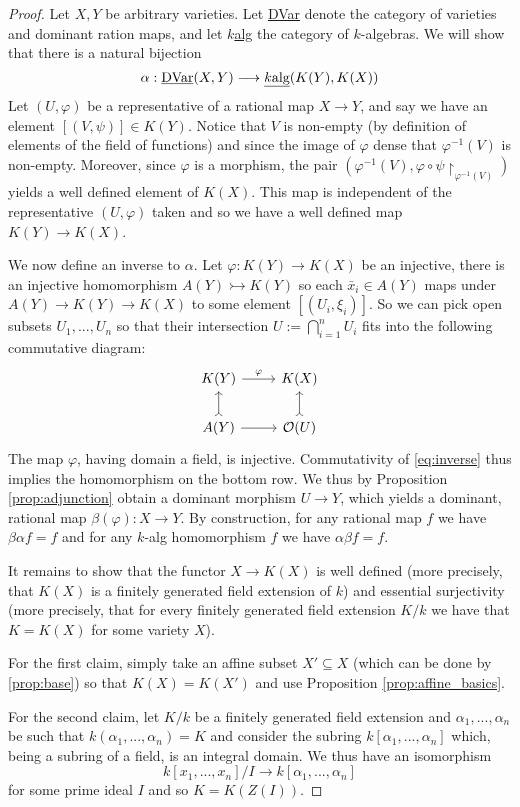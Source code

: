 \documentclass[12pt]{article}
\theoremstyle{plain}
\theoremstyle{definition}
\newcommand{\call}[1]{\mathcal{#1}}
\newcommand{\lto}{\longrightarrow}
\begin{document}
\begin{proof}
Let $X,Y$ be arbitrary varieties. Let \underline{DVar} denote the category of varieties and dominant ration maps, and let \underline{$k$alg} the category of $k$-algebras. We will show that there is a natural bijection
\begin{equation}
    \alpha: \text{\underline{DVar}}(X,Y) \lto \underline{k\text{alg}}(K(Y),K(X))
\end{equation}
Let $(U,\varphi)$ be a representative of a rational map $X \lto Y$, and say we have an element $[(V,\psi)] \in K(Y)$. Notice that $V$ is non-empty (by definition of elements of the field of functions) and since the image of $\varphi$ dense that $\varphi^{-1}(V)$ is non-empty. Moreover, since $\varphi$ is a morphism, the pair $(\varphi^{-1}(V),\varphi \circ \psi\restriction_{\varphi^{-1}(V)})$ yields a well defined element of $K(X)$. This map is independent of the representative $(U,\varphi)$ taken and so we have a well defined map $K(Y) \lto K(X)$.

We now define an inverse to $\alpha$. Let $\varphi: K(Y) \lto K(X)$ be an injective, there is an injective homomorphism $A(Y) \rightarrowtail K(Y)$ so each $\bar{x}_i \in A(Y)$ maps under $A(Y) \lto K(Y) \lto K(X)$ to some element $[(U_i, \xi_i)]$. So we can pick open subsets $U_1,...,U_n$ so that their intersection $U := \bigcap_{i = 1}^nU_i$ fits into the following commutative diagram:
\begin{equation}\label{eq:inverse}
\begin{tikzcd}
K(Y)\arrow[r,"{\varphi}"] & K(X)\\
A(Y)\arrow[u,rightarrowtail]\arrow[r] & \call{O}(U)\arrow[u,rightarrowtail]
\end{tikzcd}
\end{equation}
The map $\varphi$, having domain a field, is injective. Commutativity of \eqref{eq:inverse} thus implies the homomorphism on the bottom row. We thus by Proposition \ref{prop:adjunction} obtain a dominant morphism $U \lto Y$, which yields a dominant, rational map $\beta(\varphi): X \lto Y$. By construction, for any rational map $f$ we have $\beta\alpha f = f$ and for any $k$-alg homomorphism $f$ we have $\alpha \beta f = f$.

It remains to show that the functor $X \lto K(X)$ is well defined (more precisely, that $K(X)$ is a finitely generated field extension of $k$) and essential surjectivity (more precisely, that for every finitely generated field extension $K/k$ we have that $K = K(X)$ for some variety $X$).

For the first claim, simply take an affine subset $X' \subseteq X$ (which can be done by \ref{prop:base}) so that $K(X) = K(X')$ and use Proposition \ref{prop:affine_basics}.

For the second claim, let $K/k$ be a finitely generated field extension and $\alpha_1,...,\alpha_n$ be such that $k(\alpha_1,...,\alpha_n) = K$ and consider the subring $k[\alpha_1,...,\alpha_n]$ which, being a subring of a field, is an integral domain. We thus have an isomorphism
\[k[x_1,...,x_n]/I \lto k[\alpha_1,...,\alpha_n]\]
for some prime ideal $I$ and so $K = K(Z(I))$.
\end{proof}
\end{document}
